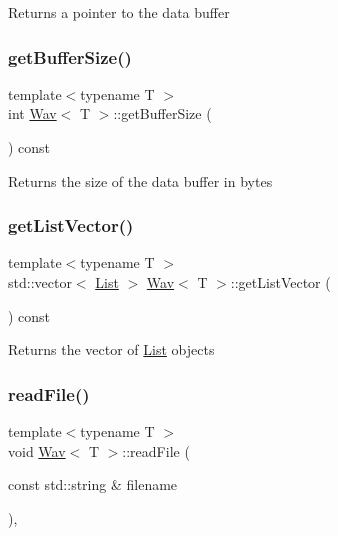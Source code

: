 Returns a pointer to the data buffer \mbox{\label{classWav_afd1ee6d72bb1bac1284a0df3ae7d9cea}} 
\subsubsection{\texorpdfstring{get\+Buffer\+Size()}{getBufferSize()}}
{\footnotesize\ttfamily template$<$typename T $>$ \\
int \hyperlink{classWav}{Wav}$<$ T $>$\+::get\+Buffer\+Size (\begin{DoxyParamCaption}{ }\end{DoxyParamCaption}) const}

Returns the size of the data buffer in bytes \mbox{\label{classWav_ad974c0f10e70e23d689d60591aa90456}} 
\subsubsection{\texorpdfstring{get\+List\+Vector()}{getListVector()}}
{\footnotesize\ttfamily template$<$typename T $>$ \\
std\+::vector$<$ \hyperlink{structList}{List} $>$ \hyperlink{classWav}{Wav}$<$ T $>$\+::get\+List\+Vector (\begin{DoxyParamCaption}{ }\end{DoxyParamCaption}) const}

Returns the vector of \hyperlink{structList}{List} objects \mbox{\label{classWav_a636a94bf0f23a4cdc9d8d59d9d567f3e}} 
\subsubsection{\texorpdfstring{read\+File()}{readFile()}}
{\footnotesize\ttfamily template$<$typename T $>$ \\
void \hyperlink{classWav}{Wav}$<$ T $>$\+::read\+File (\begin{DoxyParamCaption}\item[{const std\+::string \&}]{filename }\end{DoxyParamCaption})\hspace{0.3cm}{\ttfamily [override]}, {\ttfamily [virtual]}}

